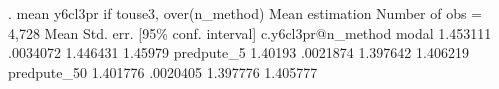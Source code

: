 . mean y6cl3pr if touse3, over(n_method)
{\smallskip}
Mean estimation                                Number of obs = 4,728
{\smallskip}
                   {\VBAR}       Mean   Std. err.     [95\% conf. interval]
c.y6cl3pr@n_method {\VBAR}
            modal  {\VBAR}   1.453111   .0034072      1.446431     1.45979
       predpute_5  {\VBAR}    1.40193   .0021874      1.397642    1.406219
      predpute_50  {\VBAR}   1.401776   .0020405      1.397776    1.405777
